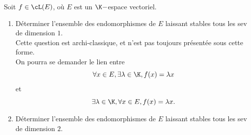 Soit $f\in \cL(E)$, où $E$ est un $\K-$espace vectoriel.

\begin{enumerate}
\item Déterminer l'ensemble des endomorphismes de $E$ laissant stables tous les sev de dimension $1$.\\

Cette question est archi-classique, et n'est pas toujours présentée sous cette forme.\\
On pourra se demander le lien entre
$$\forall x\in E,\exists \lambda \in \K,f(x)=\lambda x$$
et
$$\exists \lambda \in \K,\forall x\in E,f(x)=\lambda x.$$

\item Déterminer l'ensemble des endomorphismes de $E$ laissant stables tous les sev de dimension $2$.
\end{enumerate}
